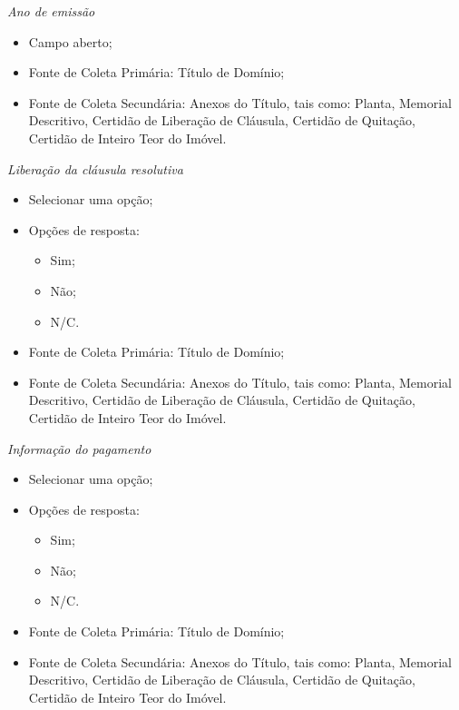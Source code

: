 \documentclass[
  letterpaper,
]{report}
\providecommand{\tightlist}{%
  \setlength{\itemsep}{0pt}\setlength{\parskip}{0pt}}\usepackage{longtable,booktabs,array}
\begin{document}
\emph{Ano de emissão}

\begin{itemize}
\tightlist
\item
  Campo aberto;
\item
  Fonte de Coleta Primária: Título de Domínio;
\item
  Fonte de Coleta Secundária: Anexos do Título, tais como: Planta,
  Memorial Descritivo, Certidão de Liberação de Cláusula, Certidão de
  Quitação, Certidão de Inteiro Teor do Imóvel.
\end{itemize}

\emph{Liberação da cláusula resolutiva}

\begin{itemize}
\tightlist
\item
  Selecionar uma opção;
\item
  Opções de resposta:

  \begin{itemize}
  \tightlist
  \item
    Sim;
  \item
    Não;
  \item
    N/C.
  \end{itemize}
\item
  Fonte de Coleta Primária: Título de Domínio;
\item
  Fonte de Coleta Secundária: Anexos do Título, tais como: Planta,
  Memorial Descritivo, Certidão de Liberação de Cláusula, Certidão de
  Quitação, Certidão de Inteiro Teor do Imóvel.
\end{itemize}

\emph{Informação do pagamento}

\begin{itemize}
\tightlist
\item
  Selecionar uma opção;
\item
  Opções de resposta:

  \begin{itemize}
  \tightlist
  \item
    Sim;
  \item
    Não;
  \item
    N/C.
  \end{itemize}
\item
  Fonte de Coleta Primária: Título de Domínio;
\item
  Fonte de Coleta Secundária: Anexos do Título, tais como: Planta,
  Memorial Descritivo, Certidão de Liberação de Cláusula, Certidão de
  Quitação, Certidão de Inteiro Teor do Imóvel.
\end{itemize}
\end{document}
